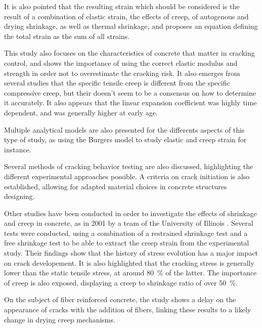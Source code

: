\documentclass{report}
\begin{document}
It is also pointed that the resulting strain which should be considered is the
result of a combination of elastic strain, the effects of creep, of autogenous
and drying shrinkage, as well as thermal shrinkage, and proposes an equation
defining the total strain as the sum of all strains.

This study also focuses on the characteristics of concrete that matter in
cracking control, and shows the importance of using the correct elastic modulus
and strength in order not to overestimate the cracking risk. It also emerges
from several studies that the specific tensile creep is different from the
specific compressive creep, but their doesn't seem to be a consensus on how to
determine it accurately. It also appears that the linear expansion coefficient
was highly time dependent, and was generally higher at early age.

Multiple analytical models are also presented for the differents aspects of
this type of study, as using the Burgers model to study elastic and creep
strain for instance.

Several methods of cracking behavior testing are also discussed, highlighting
the different experimental approaches possible. A criteria on crack initiation
is also established, allowing for adapted material choices in concrete
structures designing.

Other studies have been conducted in order to investigate the effects of
shrinkage and creep in concrete, as in 2001 by a team of the University of
Illinois \cite{cscea}. Several tests were conducted, using a combination of a
restrained shrinkage test and a free shrinkage test to be able to extract the
creep strain from the experimental study. Their findings show that the history
of stress evolution has a major impact on crack developement. It is also
highlighted that the cracking stress is generally lower than the static tensile
stress, at around \SI{80}{\percent} of the latter. The importance of creep is
also exposed, displaying a creep to shrinkage ratio of over \SI{50}{\percent}.

On the subject of fiber reinforced concrete, the study shows a delay on the
appearance of cracks with the addition of fibers, linking these results to a
likely change in drying creep mechanisms.

\nocite{*}
\printbibliography
\end{document}
